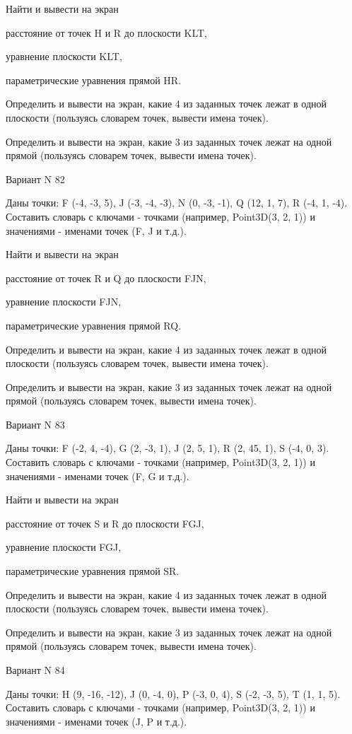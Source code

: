 \documentclass[11pt]{report}
\begin{document}
Найти и вывести на экран


расстояние от точек H и R до плоскости KLT,


уравнение плоскости KLT,


параметрические уравнения прямой HR.


Определить и вывести на экран, какие 4 из заданных точек лежат в одной плоскости (пользуясь словарем точек, вывести имена точек).


Определить и вывести на экран, какие 3 из заданных точек лежат на одной прямой (пользуясь словарем точек, вывести имена точек).

\newpage
Вариант N 82

Даны точки: F (-4, -3, 5), J (-3, -4, -3), N (0, -3, -1), Q (12, 1, 7), R (-4, 1, -4).
Составить словарь с ключами - точками (например, Point3D(3, 2, 1)) и значениями - именами точек (F, J и т.д.).


Найти и вывести на экран


расстояние от точек R и Q до плоскости FJN,


уравнение плоскости FJN,


параметрические уравнения прямой RQ.


Определить и вывести на экран, какие 4 из заданных точек лежат в одной плоскости (пользуясь словарем точек, вывести имена точек).


Определить и вывести на экран, какие 3 из заданных точек лежат на одной прямой (пользуясь словарем точек, вывести имена точек).

\newpage
Вариант N 83

Даны точки: F (-2, 4, -4), G (2, -3, 1), J (2, 5, 1), R (2, 45, 1), S (-4, 0, 3).
Составить словарь с ключами - точками (например, Point3D(3, 2, 1)) и значениями - именами точек (F, G и т.д.).


Найти и вывести на экран


расстояние от точек S и R до плоскости FGJ,


уравнение плоскости FGJ,


параметрические уравнения прямой SR.


Определить и вывести на экран, какие 4 из заданных точек лежат в одной плоскости (пользуясь словарем точек, вывести имена точек).


Определить и вывести на экран, какие 3 из заданных точек лежат на одной прямой (пользуясь словарем точек, вывести имена точек).

\newpage
Вариант N 84

Даны точки: H (9, -16, -12), J (0, -4, 0), P (-3, 0, 4), S (-2, -3, 5), T (1, 1, 5).
Составить словарь с ключами - точками (например, Point3D(3, 2, 1)) и значениями - именами точек (J, P и т.д.).
\end{document}
